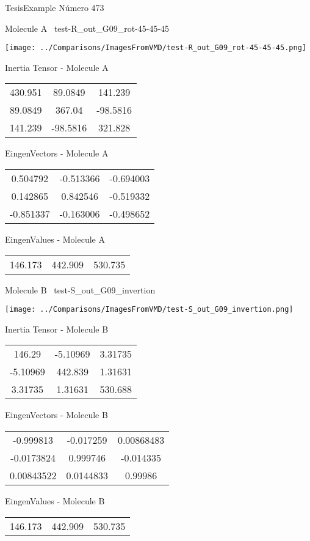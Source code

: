 \vtab[-3cm]
\begin{center}
{\large TesisExample \tab Número 473}
\end{center}
\begin{multicols}{2}
\begin{center}

Molecule A \
test-R\_out\_G09\_rot-45-45-45

\texttt{[image: ../Comparisons/ImagesFromVMD/test-R\_out\_G09\_rot-45-45-45.png]}

Inertia Tensor - Molecule A \\
\begin{tabular}{|c c c|}
430.951	 & 	89.0849	 & 	141.239	 \\
89.0849	 & 	367.04	 & 	-98.5816	 \\
141.239	 & 	-98.5816	 & 	321.828
\end{tabular}

\vtab
 EingenVectors - Molecule A     \\
\begin{tabular}{|c c c|}
0.504792	 & 	-0.513366	 & 	-0.694003	 \\
0.142865	 & 	0.842546	 & 	-0.519332	 \\
-0.851337	 & 	-0.163006	 & 	-0.498652
\end{tabular}

\vtab
 EingenValues - Molecule A     \\
\begin{tabular}{|c c c|}
146.173	 & 	442.909	 & 	530.735	 \\
\end{tabular}
\columnbreak

Molecule B \
test-S\_out\_G09\_invertion

\texttt{[image: ../Comparisons/ImagesFromVMD/test-S\_out\_G09\_invertion.png]}

Inertia Tensor - Molecule B \\
\begin{tabular}{|c c c|}
146.29	 & 	-5.10969	 & 	3.31735	 \\
-5.10969	 & 	442.839	 & 	1.31631	 \\
3.31735	 & 	1.31631	 & 	530.688
\end{tabular}

\vtab
 EingenVectors - Molecule B     \\
\begin{tabular}{|c c c|}
-0.999813	 & 	-0.017259	 & 	0.00868483	 \\
-0.0173824	 & 	0.999746	 & 	-0.014335	 \\
0.00843522	 & 	0.0144833	 & 	0.99986
\end{tabular}

\vtab
 EingenValues - Molecule B     \\
\begin{tabular}{|c c c|}
146.173	 & 	442.909	 & 	530.735	 \\
\end{tabular}

\end{center}
\end{multicols}

